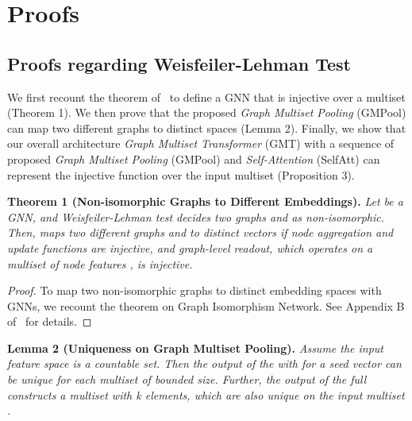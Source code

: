 \newpage

\appendix

\section{Proofs}

\subsection{Proofs regarding Weisfeiler-Lehman Test \label{appendix/wlproof}}
We first recount the theorem of~\citet{GIN} to define a GNN that is injective over a multiset (Theorem 1). We then prove that the proposed \emph{Graph Multiset Pooling} (GMPool) can map two different graphs to distinct spaces (Lemma 2). Finally, we show that our overall architecture \emph{Graph Multiset Transformer} (GMT) with a sequence of proposed \emph{Graph Multiset Pooling} (GMPool) and \emph{Self-Attention} (SelfAtt) can represent the injective function over the input multiset (Proposition 3).

\textbf{Theorem 1 (Non-isomorphic Graphs to Different Embeddings).} \emph{Let  be a GNN, and Weisfeiler-Lehman test decides two graphs  and  as non-isomorphic. Then,  maps two different graphs  and  to distinct vectors if node aggregation and update functions are injective, and graph-level readout, which operates on a multiset of node features , is injective.}

\begin{proof}
To map two non-isomorphic graphs to distinct embedding spaces with GNNs, we recount the theorem on Graph Isomorphism Network. See Appendix B of~\cite{GIN} for details.
\end{proof}

\textbf{Lemma 2 (Uniqueness on Graph Multiset Pooling).} \emph{Assume the input feature space  is a countable set. Then the output of the  with  for a seed vector  can be unique for each multiset  of bounded size. Further, the output of the full  constructs a multiset with k elements, which are also unique on the input multiset .}


